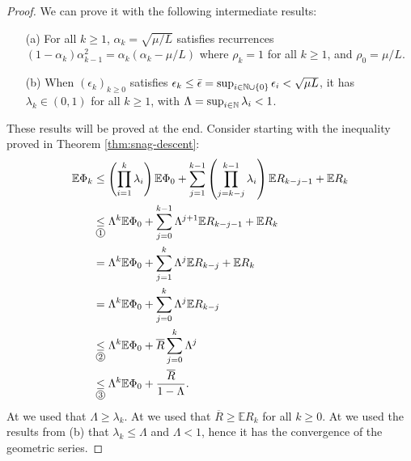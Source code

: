 \documentclass[12pt]{article}
\newcommand{\expect}{\ensuremath{\mathbb E}}
\begin{document}
        \begin{proof}
            We can prove it with the following intermediate results: 
            \begin{enumerate}[nosep]
                \item[(a)] For all $k \ge 1$, $\alpha_k = \sqrt{\mu/L}$ satisfies recurrences $(1 - \alpha_k)\alpha_{k - 1}^2 = \alpha_k(\alpha_k - \mu/L)$ where $\rho_k = 1$ for all $k \ge 1$, and $\rho_0 = \mu/L$. 
                \item[(b)] When $(\epsilon_k)_{k \ge 0}$ satisfies $\epsilon_k \le  \bar \epsilon = \sup_{i \in \mathbb N\cup\{0\}} \epsilon_i < \sqrt{\mu L}$, it has $\lambda_k \in (0, 1)$ for all $k \ge 1$, with $\Lambda = \sup_{i\in\mathbb N} \lambda_i < 1$. 
            \end{enumerate}
            These results will be proved at the end. 
            Consider starting with the inequality proved in Theorem \ref{thm:snag-descent}: 
            \begin{align*}
                \expect \Phi_k 
                &\le \left(
                    \prod_{i = 1}^k \lambda_i
                \right) \expect \Phi_0
                + \sum_{j = 1}^{k - 1}\left(
                    \prod_{j = k - j}^{k - 1} \lambda_{i}
                \right)\expect R_{k - j - 1}
                + \expect R_k
                \\
                &\underset{\circled{1}}{\le} \Lambda^k \expect \Phi_0 + \sum_{j = 0}^{k - 1} \Lambda^{j + 1} \expect R_{k - j - 1} 
                + \expect R_k
                \\
                &= \Lambda^k \expect \Phi_0 + \sum_{j = 1}^{k} \Lambda^{j} \expect R_{k - j} 
                + \expect R_k
                \\
                &= \Lambda^k \expect \Phi_0 + \sum_{j = 0}^{k} \Lambda^{j} \expect R_{k - j} 
                \\
                &\underset{\circled{2}}{\le} \Lambda^k \expect \Phi_0 + \overline R \sum_{j = 0}^{k} \Lambda^{j} 
                \\
                &\underset{\circled{3}}{\le} \Lambda^k \expect \Phi_0 + \frac{\overline R}{1 - \Lambda}. 
            \end{align*}
            At  we used that $\Lambda \ge \lambda_k$. 
            At  we used that $\overline R \ge \expect R_{k}$ for all $k \ge 0$. 
            At  we used the results from (b) that $\lambda_k \le \Lambda$ and $\Lambda < 1$, hence it has the convergence of the geometric series. 

\end{proof}
\end{document}
